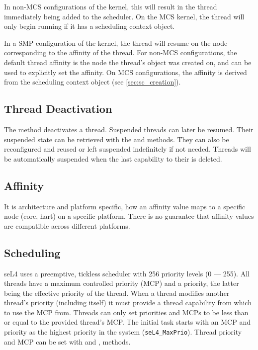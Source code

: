 In non-MCS configurations of the kernel, this will result in the thread immediately being added to
the scheduler. On the MCS kernel, the thread will only begin running if it has a
scheduling context object.

In a SMP configuration of the kernel, the thread will resume on the node
corresponding to the affinity of the thread. For non-MCS configurations, the
default thread affinity is the node the thread's  object was created
on, and  can be used to
explicitly set the affinity. On MCS configurations, the affinity is derived
from the scheduling context object (see \autoref{sec:sc_creation}).

\subsection{Thread Deactivation}
\label{sec:thread_deactivation}

The  method deactivates a thread.
Suspended threads can later be resumed.
Their suspended state can be retrieved with the
 and
 methods.
They can also be reconfigured and
reused or left suspended indefinitely if not needed. Threads will be
automatically suspended when the last capability to their  is
deleted.

\subsection{Affinity}
\label{sec:thread_affinity}

It is architecture and platform specific, how an affinity value maps to a
specific node (core, hart) on a specific platform. There is no guarantee that
affinity values are compatible across different platforms.


\subsection{Scheduling}
\label{sec:sched}

seL4 uses a preemptive, tickless scheduler with 256 priority levels (0 --- 255).  All threads have
a maximum controlled priority (MCP) and a priority, the latter being the effective priority of the
thread.
When a thread modifies another thread's priority (including itself) it must provide a
thread capability from which to use the MCP from. Threads can only set priorities and MCPs
to be less than or equal to the provided thread's MCP.
The initial task starts with an MCP and priority as the highest priority in the system (\texttt{seL4\_MaxPrio}).
Thread priority and MCP can be
set with  and
,
 methods.


